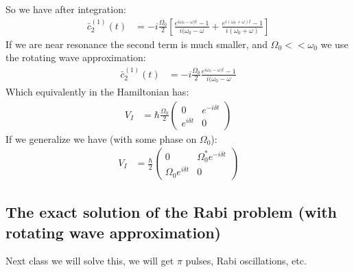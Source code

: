 So we have after integration:
\begin{align*}
	\bar{c}_2^{(1)}(t) &= -i\frac{\Omega_0}{2} \left[ \frac{e^{i\omega_0-\omega)t} -1 }{i(\omega_0-\omega} + \frac{e^{i(\omega_0 + \omega) t} - 1}{i(\omega_0 + \omega)}\right]
\end{align*}
If we are near resonance the second term is much smaller, and $\Omega_0 << \omega_0$ we use the rotating wave approximation:
\begin{align*}
	\bar{c}_2^{(1)}(t) &= -i\frac{\Omega_0}{2}\frac{e^{i\omega_0-\omega)t} -1 }{i(\omega_0-\omega} 
\end{align*}
Which equivalently in the Hamiltonian has:
\begin{align*}
	V_I &= \hbar \frac{\Omega_0}{2} \begin{pmatrix}
		0 & e^{-i\delta t} \\
		e^{i\delta t} & 0
		\end{pmatrix}
\end{align*}
If we generalize we have (with some phase on $\Omega_0$):
\begin{align*}
	V_I &= \frac{\hbar }{2} \begin{pmatrix}
		0 & \Omega_0^*e^{-i\delta t} \\
		\Omega_0e^{i\delta t} & 0
		\end{pmatrix}
\end{align*}
\subsection{The exact solution of the Rabi problem (with rotating wave approximation)}
Next class we will solve this, we will get $\pi$ pulses, Rabi oscillations, etc.
